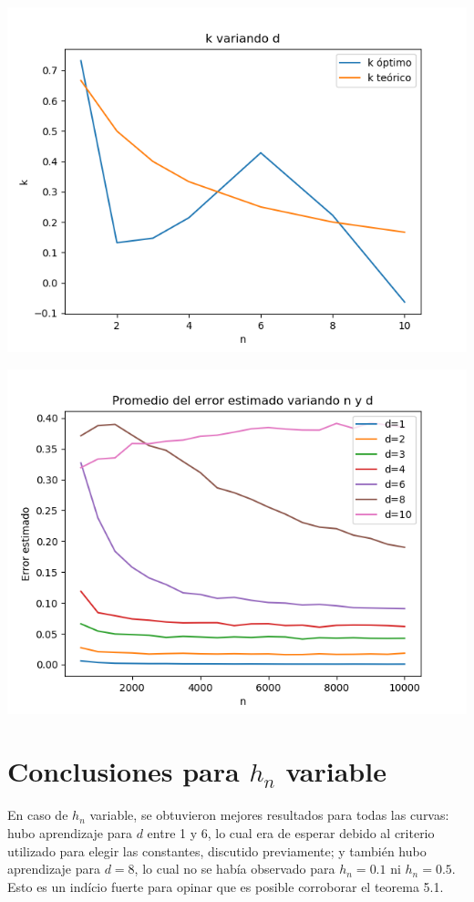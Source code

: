 \documentclass[12pt, a4paper]{article}
\begin{document}
\includegraphics[width=\textwidth]{figuras_h_semidinamico/k-variando-d}

\includegraphics[width=\textwidth]{figuras_h_semidinamico/resultados-grales}

\section{Conclusiones para $h_n$ variable}

En caso de $h_n$ variable, se obtuvieron mejores resultados para todas las curvas: hubo aprendizaje para $d$ entre 1 y 6, lo cual era de esperar debido al criterio utilizado para elegir las constantes, discutido previamente; y también hubo aprendizaje para $d=8$, lo cual no se había observado para $h_n=0.1$ ni $h_n=0.5$. Esto es un indício fuerte para opinar que es posible corroborar el teorema 5.1.
\end{document}
